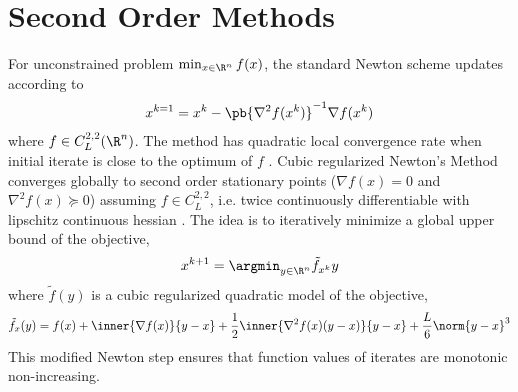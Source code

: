 \documentclass[../summary.tex]{subfiles}
\begin{document}
 
\section{Second Order Methods}

For unconstrained problem $\min_{x\in\R^n} f(x)$, the standard Newton scheme updates according to
\begin{align} 
    x^{k=1} 
        = x^k - \pb{\nabla^2 f(x^k)}^{-1} \nabla f(x^k)
\end{align} 
where $f \in C_{L}^{2,2}(\R^n)$. The method has quadratic local convergence rate when initial iterate is close to the optimum of $f$ \cite{nesterovIntroductoryLecturesConvex2004}. Cubic regularized Newton's Method converges globally to second order stationary points ($\nabla f(x) = 0$ and $\nabla^2 f(x) \succeq 0$) assuming $f\in C_{L}^{2,2}$, i.e. twice continuously differentiable with lipschitz continuous hessian \cite{nesterovCubicRegularizationNewton2006, nesterovCubicRegularizationNewton2006a}. The idea is to iteratively minimize a global upper bound of the objective,
\begin{align}
    x^{k+1} =  \argmin_{y\in\R^n} \tilde{f}_{x^k}{y}
\end{align}
where $\tilde{f}(y)$ is a cubic regularized quadratic model of the objective,
\begin{align} 
    \tilde{f}_{x}(y)
        = f(x) + \inner{\nabla f(x)}{y-x} + \frac{1}{2}\inner{\nabla^2 f(x)(y-x)}{y-x} + \frac{L}{6}\norm{y-x}^3
\end{align} 
This modified Newton step ensures that function values of iterates are monotonic non-increasing.
\end{document}
